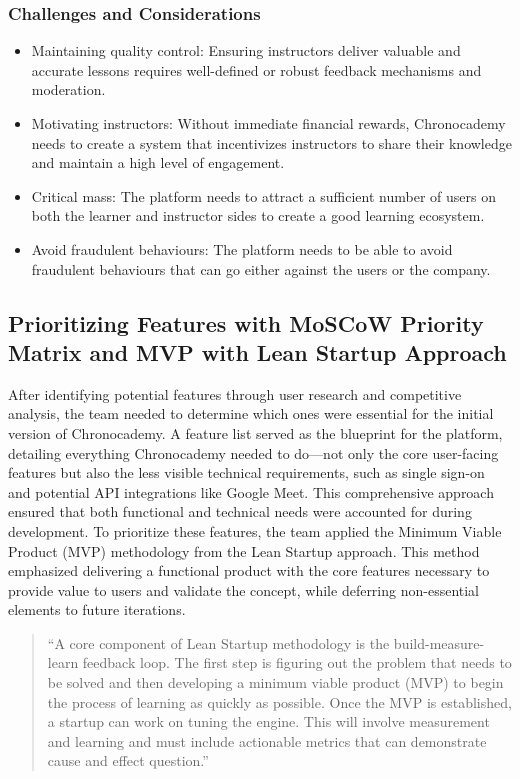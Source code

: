 \subsubsection{Challenges and Considerations}
\begin{itemize}
    \item Maintaining quality control: Ensuring instructors deliver valuable and accurate lessons requires well-defined or robust feedback mechanisms and moderation.
    \item Motivating instructors: Without immediate financial rewards, Chronocademy needs to create a system that incentivizes instructors to share their knowledge and maintain a high level of engagement.
    \item Critical mass: The platform needs to attract a sufficient number of users on both the learner and instructor sides to create a good learning ecosystem.
    \item Avoid fraudulent behaviours: The platform needs to be able to avoid fraudulent behaviours that can go either against the users or the company.
\end{itemize}

\subsection{Prioritizing Features with MoSCoW Priority Matrix and MVP with Lean Startup Approach}\label{subsec:prioritizing-features-with-the-lean-startup-approach}
After identifying potential features through user research and competitive analysis, the team needed to determine which ones were essential for the initial version of Chronocademy.
A feature list served as the blueprint for the platform, detailing everything Chronocademy needed to do—not only the core user-facing features but also the less visible technical requirements, such as single sign-on and potential API integrations like Google Meet.
This comprehensive approach ensured that both functional and technical needs were accounted for during development.
To prioritize these features, the team applied the Minimum Viable Product (MVP) methodology from the Lean Startup approach.
This method emphasized delivering a functional product with the core features necessary to provide value to users and validate the concept, while deferring non-essential elements to future iterations.

\begin{quote}
    ``A core component of Lean Startup methodology is the build-measure-learn feedback loop.
    The first step is figuring out the problem that needs to be solved and then developing a minimum viable product (MVP) to begin the process of learning as quickly as possible.
    Once the MVP is established, a startup can work on tuning the engine.
    This will involve measurement and learning and must include actionable metrics that can demonstrate cause and effect question.''
    \cite[Lean StartUp]{leanStartUp}
\end{quote}

